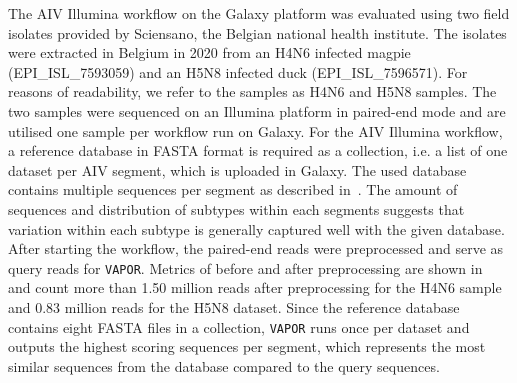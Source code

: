 The \ac{AIV} Illumina workflow on the Galaxy platform was evaluated using two field isolates provided by Sciensano, the Belgian national health institute. The isolates were extracted in Belgium in 2020 from an H4N6 infected magpie (EPI\_ISL\_7593059) and an H5N8 infected duck (EPI\_ISL\_7596571). For reasons of readability, we refer to the samples as H4N6 and H5N8 samples. The two samples were sequenced on an Illumina platform in paired-end mode and are utilised one sample per workflow run on Galaxy. For the \ac{AIV} Illumina workflow, a reference database in FASTA format is required as a collection, i.e. a list of one dataset per \ac{AIV} segment, which is uploaded in Galaxy. The used database contains multiple sequences per segment as described in~. The amount of sequences and distribution of subtypes within each segments suggests that variation within each subtype is generally captured well with the given database.\\
After starting the workflow, the paired-end reads were preprocessed and serve as query reads for \texttt{VAPOR}. Metrics of before and after preprocessing are shown in~ and count more than 1.50 million reads after preprocessing for the H4N6 sample and 0.83 million reads for the H5N8 dataset. Since the reference database contains eight FASTA files in a collection, \texttt{VAPOR} runs once per dataset and outputs the highest scoring sequences per segment, which represents the most similar sequences from the database compared to the query sequences. \\

